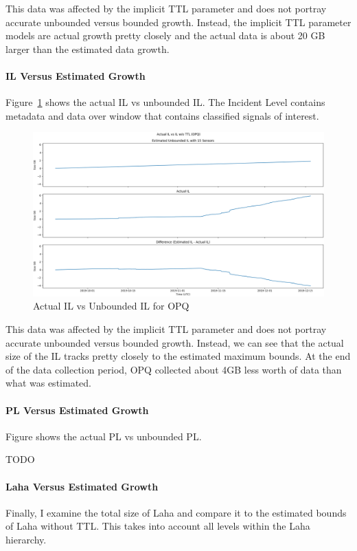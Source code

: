 This data was affected by the implicit TTL parameter and does not portray accurate unbounded versus bounded growth. Instead, the implicit TTL parameter models are actual growth pretty closely and the actual data is about 20 GB larger than the estimated data growth.

\paragraph{IL Versus Estimated Growth}
Figure~\ref{fig:actual_il_vs_unbounded_opq} shows the actual IL vs unbounded IL. The Incident Level contains metadata and data over window that contains classified signals of interest.

\begin{figure}[H]
    \centering
    \includegraphics[width=\linewidth]{figures/actual_il_vs_unbounded_opq.png}
    \caption{Actual IL vs Unbounded IL for OPQ}
    \label{fig:actual_il_vs_unbounded_opq}
\end{figure}

This data was affected by the implicit TTL parameter and does not portray accurate unbounded versus bounded growth. Instead, we can see that the actual size of the IL tracks pretty closely to the estimated maximum bounds. At the end of the data collection period, OPQ collected about 4GB less worth of data than what was estimated.

\paragraph{PL Versus Estimated Growth}
Figure shows the actual PL vs unbounded PL.

TODO

\paragraph{Laha Versus Estimated Growth}
Finally, I examine the total size of Laha and compare it to the estimated bounds of Laha without TTL. This takes into account all levels within the Laha hierarchy.

